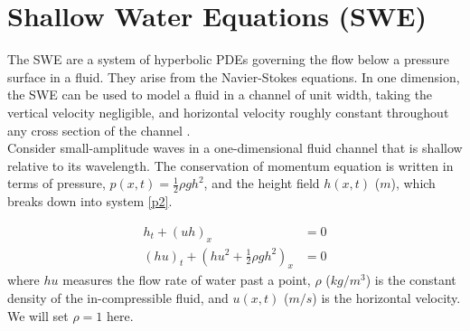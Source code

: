 \documentclass[11pt,a4paper]{article}
\begin{document}
	\section{Shallow Water Equations (SWE)}
	The SWE are a system of hyperbolic PDEs governing the flow below a pressure surface in a fluid. They arise from the Navier-Stokes equations.  In one dimension, the SWE  can be used to model a fluid in a channel of unit width, taking the vertical velocity negligible, and horizontal velocity roughly constant throughout any cross section of the channel  \cite{ge:2008}.  \\
	
	Consider small-amplitude waves in a one-dimensional fluid channel that is shallow relative to its wavelength. The conservation of momentum equation is written in terms of pressure, $p(x,t) = \frac{1}{2}\rho gh^{2}$, and the height field $h(x,t)$ ($m$), which breaks down into system \eqref{p2}.
	
	\begin{equation}
		\begin{aligned}
			h_{t} + (uh)_x &= 0 \\
			(hu)_t + \left(hu^{2} + \frac{1}{2}\rho gh^{2} \right)_x & = 0 
		\end{aligned}
		\label{p2}
	\end{equation}	
	where $hu$ measures the flow rate of water past a point,  $\rho$ ($kg/m^3$) is the constant density of the in-compressible fluid, and $u(x,t)$ ($m/s$) is the horizontal velocity.  We will set $\rho = 1$ here.\\
	
\end{document}
